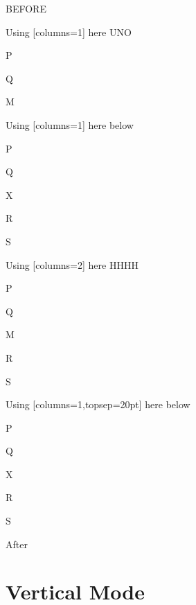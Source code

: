 \documentclass[12pt]{article}
\begin{document}
BEFORE
\begin{enumext}[columns=2]
\item Using [columns=1] here UNO
  \begin{enumext}[columns=1,topsep=20pt,partopsep=20pt]%
     \item  P \item Q \item M %
  \end{enumext}

\item Using [columns=1] here below
\begin{enumext}[columns=1,topsep=20pt]%
     \item  P \item Q \item X  \item R \item S
  \end{enumext}

\columnbreak

\item Using [columns=2] here HHHH
  \begin{enumext}[columns=2,topsep=20pt,partopsep=20pt]%
    \item  P \item Q \item M \item R \item S
  \end{enumext}

\item Using [columns=1,topsep=20pt] here below
\begin{enumext}[columns=1,topsep=20pt]%
     \item  P \item Q \item X  \item R \item S
  \end{enumext}

\end{enumext}
After

\newpage
\section*{Vertical Mode}
\end{document}
